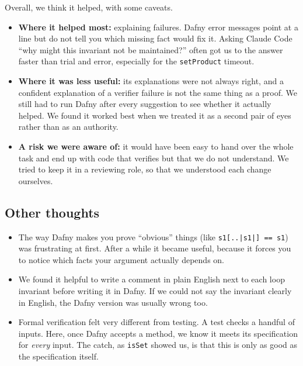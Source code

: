 \documentclass[11pt,a4paper]{article}
\begin{document}
Overall, we think it helped, with some caveats.

\begin{itemize}
  \item \textbf{Where it helped most:} explaining failures. Dafny error messages point at a line but do not tell you which missing fact would fix it. Asking Claude Code ``why might this invariant not be maintained?'' often got us to the answer faster than trial and error, especially for the \texttt{setProduct} timeout.
  \item \textbf{Where it was less useful:} its explanations were not always right, and a confident explanation of a verifier failure is not the same thing as a proof. We still had to run Dafny after every suggestion to see whether it actually helped. We found it worked best when we treated it as a second pair of eyes rather than as an authority.
  \item \textbf{A risk we were aware of:} it would have been easy to hand over the whole task and end up with code that verifies but that we do not understand. We tried to keep it in a reviewing role, so that we understood each change ourselves.
\end{itemize}

\subsection{Other thoughts}

\begin{itemize}
  \item The way Dafny makes you prove ``obvious'' things (like \texttt{s1[..|s1|] == s1}) was frustrating at first. After a while it became useful, because it forces you to notice which facts your argument actually depends on.
  \item We found it helpful to write a comment in plain English next to each loop invariant before writing it in Dafny. If we could not say the invariant clearly in English, the Dafny version was usually wrong too.
  \item Formal verification felt very different from testing. A test checks a handful of inputs. Here, once Dafny accepts a method, we know it meets its specification for \emph{every} input. The catch, as \texttt{isSet} showed us, is that this is only as good as the specification itself.
\end{itemize}
\end{document}
